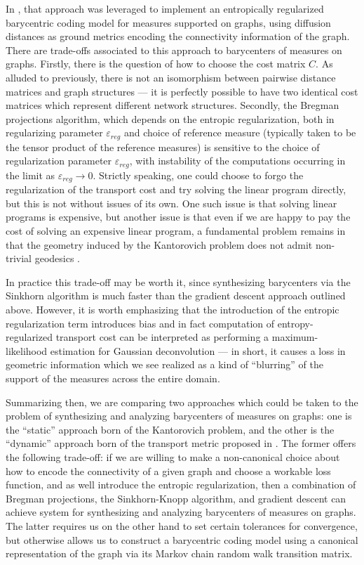 \documentclass{article}
\begin{document}
In \cite{gentile2025regularized}, that approach was leveraged to implement an entropically regularized barycentric coding model for measures supported on graphs, using diffusion distances as ground metrics encoding the connectivity information of the graph. There are trade-offs associated to this approach to barycenters of measures on graphs. Firstly, there is the question of how to choose the cost matrix \(C\).  As alluded to previously, there is not an isomorphism between pairwise distance matrices and graph structures --- it is perfectly possible to have two identical cost matrices which represent different network structures. Secondly, the Bregman projections algorithm, which depends on the entropic regularization, both in regularizing parameter \(\varepsilon_{reg}\) and choice of reference measure (typically taken to be the tensor product of the reference measures) is sensitive to the choice of regularization parameter \(\varepsilon_{reg}\), with instability of the computations occurring in the limit as \(\varepsilon_{reg} \to 0\).  Strictly speaking, one could choose to forgo the regularization of the transport cost and try solving the linear program directly, but this is not without issues of its own. One such issue is that solving linear programs is expensive, but another issue is that even if we are happy to pay the cost of solving an expensive linear program, a fundamental problem remains in that the geometry induced by the Kantorovich problem does not admit non-trivial geodesics \cite{maasGradientFlowsEntropy2011}.

In practice this trade-off may be worth it, since synthesizing barycenters via the Sinkhorn algorithm is much faster than the gradient descent approach outlined above.  However, it is worth emphasizing that the introduction of the entropic regularization term introduces bias and in fact computation of entropy-regularized transport cost can be interpreted as performing a maximum-likelihood estimation for Gaussian deconvolution \cite{rigolletEntropicOptimalTransport2018} --- in short, it causes a loss in geometric information which we see realized as a kind of ``blurring'' of the support of the measures across the entire domain.

Summarizing then, we are comparing two approaches which could be taken to the problem of synthesizing and analyzing barycenters of measures on graphs: one is the ``static'' approach born of the Kantorovich problem, and the other is the ``dynamic'' approach born of the transport metric proposed in \cite{maasGradientFlowsEntropy2011}. The former offers the following trade-off: if we are willing to make a non-canonical choice about how to encode the connectivity of a given graph and choose a workable loss function, and as well introduce the entropic regularization, then a combination of Bregman projections, the Sinkhorn-Knopp algorithm, and gradient descent can achieve system for synthesizing and analyzing barycenters of measures on graphs. The latter requires us on the other hand to set certain tolerances for convergence, but otherwise allows us to construct a barycentric coding model using a canonical representation of the graph via its Markov chain random walk transition matrix.
\end{document}
